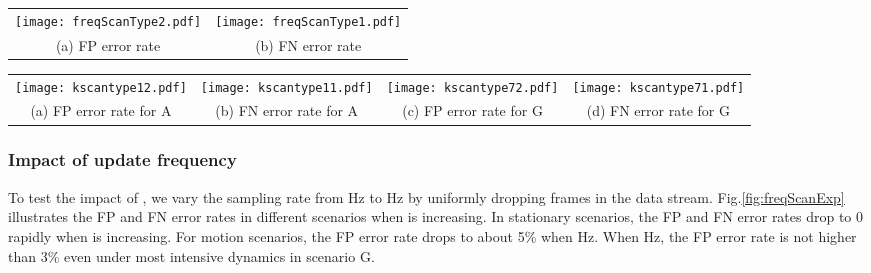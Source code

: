 \documentclass[conference]{IEEEtran}
\begin{document}
\begin{figure*}
\begin{center}
\begin{tabular}{cc}
  \hspace{-0.1in}\texttt{[image: freqScanType2.pdf]}
   & \texttt{[image: freqScanType1.pdf]} \\
  (a) FP error rate & (b) FN error rate
\end{tabular}
\end{center}
\caption{Impacts of update frequency on dete52ction error rate. Both the FP and FN errors decrease when update frequency  is increasing. In Scenarios A, B, and C, both the error rate quickly converge to , while for Scenarios D, E, F, G, higher frequency are needed to cut down the error rate. }
\label{fig:freqScanExp}
\end{figure*}

\begin{figure*}
\begin{center}
\begin{tabular}{cccc}
\hspace{-0.25in}\texttt{[image: kscantype12.pdf]} \hspace{-0.3in} &
\texttt{[image: kscantype11.pdf]} \hspace{-0.3in} &
\texttt{[image: kscantype72.pdf]} \hspace{-0.3in} &
\texttt{[image: kscantype71.pdf]}  \\
(a) FP error rate for A&(b) FN error rate for A&(c) FP error rate for G&(d) FN error rate for G
\end{tabular}
\end{center}
\caption{The combined impacts of value  and update frequency  in two scenarios A and G. (a) and (b) show the FP and FN error rates for Scenario A, and (c) (d) for G.
}
\vspace{-0.1in}
\label{fig:kscan}
\end{figure*}


\subsubsection{Impact of update frequency }




To test the impact of , we vary the sampling rate  from Hz to Hz by uniformly dropping frames in the data stream. Fig.\ref{fig:freqScanExp} illustrates the FP and FN error rates in different scenarios when  is increasing. In stationary scenarios, the FP and FN error rates drop to 0 rapidly when  is increasing. For motion scenarios, the FP error rate drops to about 5\% when Hz. When Hz, the FP error rate is not higher than 3\% even under most intensive dynamics in scenario G.
\end{document}

